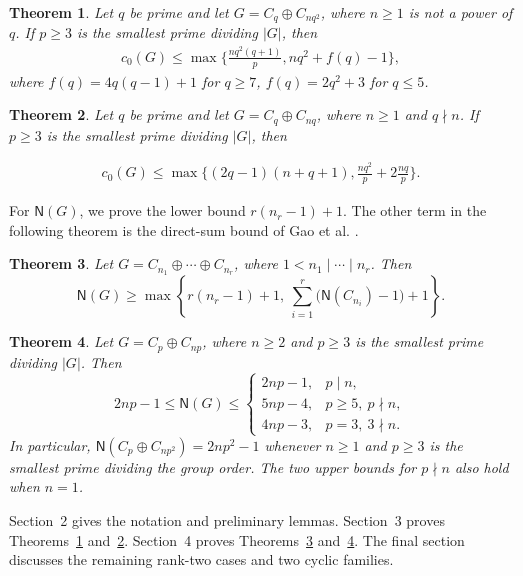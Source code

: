 \documentclass[10pt,a4paper]{amsart}
\newtheorem{thm}{Theorem} [section]
\theoremstyle{definition}
\theoremstyle{remark}
\numberwithin{equation}{section}
\begin{document}
\begin{thm}\label{thm5.1}
	Let $q$ be prime and let $G=C_q\oplus C_{nq^2}$, where $n\ge1$ is not a power of $q$. If $p\ge3$ is the smallest prime dividing $|G|$, then
	\begin{align*}
		c_0(G)\le \max \{\frac{nq^2(q+1)}{p},nq^2 +f(q) -1\},
	\end{align*}
	where $f(q)= 4q(q-1) +1$ for $q\ge 7$, $f(q)= 2q^2 +3$ for $q\le 5$.
\end{thm}

\begin{thm}\label{thm1.2}
	Let $q$ be prime and let $G=C_q\oplus C_{nq}$, where $n\ge1$ and $q\nmid n$. If $p\ge3$ is the smallest prime dividing $|G|$, then
	
	\begin{align*}
		c_0(G)\le \max \{(2q-1)(n+q+1),\frac{nq^2}{p} +2\frac{nq}{p}\}. 
	\end{align*}
	
\end{thm}

For $\mathsf N(G)$, we prove the lower bound $r(n_r-1)+1$.
The other term in the following theorem is the direct-sum bound of
Gao et al. \cite[Theorem~1.1(2)]{[GHHLYZ2022-2]}.

\begin{thm}\label{thm1.4}
Let $G=C_{n_1}\oplus\cdots\oplus C_{n_r}$, where
$1<n_1\mid\cdots\mid n_r$. Then
\[
\mathsf{N}(G)\ge
\max\left\{r(n_r-1)+1,\ \sum_{i=1}^r\bigl(\mathsf{N}(C_{n_i})-1\bigr)+1\right\}.
\]
\end{thm}

\begin{thm}\label{thm1.5}
Let $G=C_p\oplus C_{np}$, where $n\ge2$ and $p\ge3$ is the
smallest prime dividing $|G|$. Then
\[
 2np-1\le\mathsf N(G)\le
 \begin{cases}
 2np-1,&p\mid n,\\
 5np-4,&p\ge5,\ p\nmid n,\\
 4np-3,&p=3,\ 3\nmid n.
 \end{cases}
\]
In particular, $\mathsf N(C_p\oplus C_{np^2})=2np^2-1$
whenever $n\ge1$ and $p\ge3$ is the smallest prime dividing the group order.
The two upper bounds for $p\nmid n$ also hold when $n=1$.
\end{thm}

Section~2 gives the notation and preliminary lemmas.
Section~3 proves Theorems~\ref{thm5.1} and~\ref{thm1.2}.
Section~4 proves Theorems~\ref{thm1.4} and~\ref{thm1.5}.
The final section discusses the remaining rank-two cases and two cyclic families.
\end{document}
